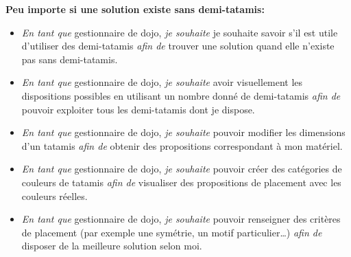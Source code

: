 \textbf{Peu importe si une solution existe sans demi-tatamis:}
\begin{itemize}
    \item \emph{En tant que } gestionnaire de dojo,
    \emph{ je souhaite} je souhaite savoir s'il est utile d’utiliser des demi-tatamis
    \emph{ afin de } trouver une solution quand elle n’existe pas sans demi-tatamis.
    \item \emph{En tant que } gestionnaire de dojo,
    \emph{ je souhaite} avoir visuellement les dispositions possibles en utilisant un nombre donné de demi-tatamis
    \emph{ afin de } pouvoir exploiter tous les demi-tatamis dont je dispose. 
    \item \emph{En tant que } gestionnaire de dojo,
    \emph{ je souhaite} pouvoir modifier les dimensions d'un tatamis
     \emph{ afin de } obtenir des propositions correspondant à mon matériel.
    \item \emph{En tant que } gestionnaire de dojo,
    \emph{ je souhaite} pouvoir créer des catégories de couleurs de tatamis
     \emph{ afin de } visualiser des propositions de placement avec les couleurs réelles.
    \item \emph{En tant que } gestionnaire de dojo,
    \emph{ je souhaite} pouvoir renseigner des critères de placement (par exemple une symétrie, un motif particulier…) 
    \emph{ afin de } disposer de la meilleure solution selon moi.
\end{itemize}